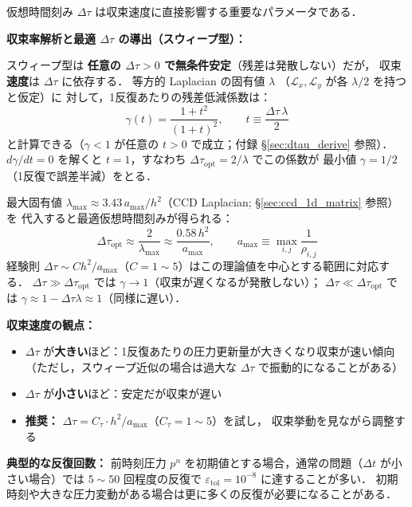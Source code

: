 \begin{tcolorbox}[defbox, title={最適仮想時間刻み $\Delta\tau$ の選択指針}]
仮想時間刻み $\Delta\tau$ は収束速度に直接影響する重要なパラメータである．

\textbf{収束率解析と最適 $\Delta\tau$ の導出（スウィープ型）：}

スウィープ型は \textbf{任意の $\Delta\tau > 0$ で無条件安定}（残差は発散しない）だが，
収束\textbf{速度}は $\Delta\tau$ に依存する．
等方的 Laplacian の固有値 $\lambda$ （$\mathcal{L}_x,\mathcal{L}_y$ が各 $\lambda/2$ を持つと仮定）に
対して，1反復あたりの残差低減係数は：
\[
  \gamma(t) = \frac{1 + t^2}{(1+t)^2},
  \qquad t \equiv \frac{\Delta\tau\,\lambda}{2}
\]
と計算できる（$\gamma < 1$ が任意の $t > 0$ で成立；付録 §\ref{sec:dtau_derive} 参照）．
$d\gamma/dt = 0$ を解くと $t = 1$，すなわち $\Delta\tau_{\mathrm{opt}} = 2/\lambda$ でこの係数が
最小値 $\gamma=1/2$（1反復で誤差半減）をとる．

最大固有値 $\lambda_{\max} \approx 3.43\,a_{\max}/h^2$（CCD Laplacian; §\ref{sec:ccd_1d_matrix} 参照）を
代入すると最適仮想時間刻みが得られる：
\begin{equation}
  \Delta\tau_{\mathrm{opt}}
  \approx \frac{2}{\lambda_{\max}}
  \approx \frac{0.58\,h^2}{a_{\max}},
  \qquad
  a_{\max} \equiv \max_{i,j} \frac{1}{\rho_{i,j}}
  \label{eq:dtau_opt}
\end{equation}
経験則 $\Delta\tau \sim C h^2/a_{\max}$（$C=1\sim5$）はこの理論値を中心とする範囲に対応する．
$\Delta\tau \gg \Delta\tau_{\mathrm{opt}}$ では $\gamma \to 1$（収束が遅くなるが発散しない）；
$\Delta\tau \ll \Delta\tau_{\mathrm{opt}}$ では $\gamma \approx 1 - \Delta\tau\lambda \approx 1$（同様に遅い）．

\textbf{収束速度の観点：}
\begin{itemize}
  \item $\Delta\tau$ が\textbf{大きい}ほど：1反復あたりの圧力更新量が大きくなり収束が速い傾向
        （ただし，スウィープ近似の場合は過大な $\Delta\tau$ で振動的になることがある）
  \item $\Delta\tau$ が\textbf{小さい}ほど：安定だが収束が遅い
  \item \textbf{推奨：} $\Delta\tau = C_\tau \cdot h^2 / a_{\max}$（$C_\tau = 1 \sim 5$）を試し，
        収束挙動を見ながら調整する
\end{itemize}

\textbf{典型的な反復回数：}
前時刻圧力 $p^n$ を初期値とする場合，通常の問題（$\Delta t$ が小さい場合）では
$5 \sim 50$ 回程度の反復で $\varepsilon_\text{tol} = 10^{-8}$ に達することが多い．
初期時刻や大きな圧力変動がある場合は更に多くの反復が必要になることがある．


\end{tcolorbox}
